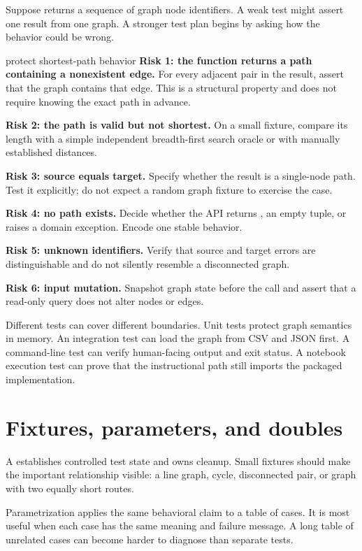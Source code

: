 Suppose  returns a sequence of graph node
identifiers. A weak test might assert one result from one graph. A stronger test
plan begins by asking how the behavior could be wrong.

\begin{workedexample}{protect shortest-path behavior}
\textbf{Risk 1: the function returns a path containing a nonexistent edge.}
For every adjacent pair in the result, assert that the graph contains that edge.
This is a structural property and does not require knowing the exact path in
advance.

\textbf{Risk 2: the path is valid but not shortest.} On a small fixture, compare
its length with a simple independent breadth-first search oracle or with
manually established distances.

\textbf{Risk 3: source equals target.} Specify whether the result is a
single-node path. Test it explicitly; do not expect a random graph fixture to
exercise the case.

\textbf{Risk 4: no path exists.} Decide whether the API returns , an
empty tuple, or raises a domain exception. Encode one stable behavior.

\textbf{Risk 5: unknown identifiers.} Verify that source and target errors are
distinguishable and do not silently resemble a disconnected graph.

\textbf{Risk 6: input mutation.} Snapshot graph state before the call and assert
that a read-only query does not alter nodes or edges.
\end{workedexample}

Different tests can cover different boundaries. Unit tests protect graph
semantics in memory. An integration test can load the graph from CSV and JSON
first. A command-line test can verify human-facing output and exit status. A
notebook execution test can prove that the instructional path still imports the
packaged implementation.

\section{Fixtures, parameters, and doubles}

A  establishes controlled test state and owns cleanup. Small
fixtures should make the important relationship visible: a line graph, cycle,
disconnected pair, or graph with two equally short routes.

Parametrization applies the same behavioral claim to a table of cases. It is
most useful when each case has the same meaning and failure message. A long
table of unrelated cases can become harder to diagnose than separate tests.

